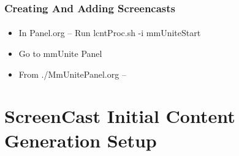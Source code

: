 \begin{frame}[fragile,label=CreatingAndAddingScreencasts]
    \frametitle{Creating And Adding Screencasts}
    \framesubtitle{}

\begin{itemize}
\item In Panel.org -- Run  lcntProc.sh -i mmUniteStart 
\item Go to mmUnite Panel
\item From ./MmUnitePanel.org -- 
\end{itemize}



\end{frame}



\begin{comment}
*  [[elisp:(org-cycle)][| ]] [[elisp:(org-show-subtree)][|=]] [[elisp:(show-children 10)][|V]] [[elisp:(bx:orgm:indirectBufOther)][|>]] [[elisp:(bx:orgm:indirectBufMain)][|I]] [[elisp:(blee:ppmm:org-mode-toggle)][|N]] [[elisp:(org-top-overview)][|O]] [[elisp:(progn (org-shifttab) (org-content))][|C]] [[elisp:(delete-other-windows)][|1]]  /Section/   ScreenCast Initial Content Generation Setup ::  [[elisp:(org-cycle)][| ]]
\end{comment}

\section{ScreenCast Initial Content Generation Setup}



\begin{comment}
*****  [[elisp:(org-cycle)][| ]]  [[elisp:(blee:ppmm:org-mode-toggle)][Nat]] [[elisp:(beginning-of-buffer)][Top]] [[elisp:(delete-other-windows)][(1)]] || /Frame/ *Label=ScreenCastInitialContentGenerationSetup*  ScreenCast Initial Content Generation Setup ::  [[elisp:(org-cycle)][| ]]
\end{comment}

